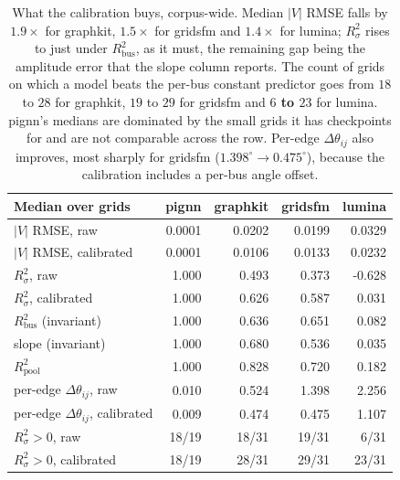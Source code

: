 \documentclass[10pt]{article}
\begin{document}
\begin{table}[H]
\centering\small
\begin{tabular}{lrrrr}
\toprule
Median over grids & pignn & graphkit & gridsfm & lumina\\
\midrule
$|V|$ RMSE, raw & 0.0001 & 0.0202 & 0.0199 & 0.0329 \\
$|V|$ RMSE, calibrated & 0.0001 & 0.0106 & 0.0133 & 0.0232 \\
$R^2_{\sigma}$, raw & 1.000 & 0.493 & 0.373 & -0.628 \\
$R^2_{\sigma}$, calibrated & 1.000 & 0.626 & 0.587 & 0.031 \\
$R^2_{\mathrm{bus}}$ (invariant) & 1.000 & 0.636 & 0.651 & 0.082 \\
slope (invariant) & 1.000 & 0.680 & 0.536 & 0.035 \\
$R^2_{\mathrm{pool}}$ & 1.000 & 0.828 & 0.720 & 0.182 \\
per-edge $\Delta\theta_{ij}$, raw & 0.010 & 0.524 & 1.398 & 2.256 \\
per-edge $\Delta\theta_{ij}$, calibrated & 0.009 & 0.474 & 0.475 & 1.107 \\
\midrule
$R^2_{\sigma}>0$, raw & 18/19 & 18/31 & 19/31 & 6/31 \\
$R^2_{\sigma}>0$, calibrated & 18/19 & 28/31 & 29/31 & 23/31 \\
\bottomrule
\end{tabular}
\caption{What the calibration buys, corpus-wide.  Median $|V|$ RMSE falls by
$1.9\times$ for graphkit, $1.5\times$ for gridsfm and $1.4\times$ for lumina;
$R^2_{\sigma}$ rises to just under $R^2_{\mathrm{bus}}$, as it must, the
remaining gap being the amplitude error that the slope column reports.  The
count of grids on which a model beats the per-bus constant predictor goes from
$18$ to $28$ for graphkit, $19$ to $29$ for gridsfm and \textbf{$6$ to $23$}
for lumina.  pignn's medians are dominated by the small grids it has
checkpoints for and are not comparable across the row.  Per-edge
$\Delta\theta_{ij}$ also improves, most sharply for gridsfm
($1.398^\circ\to0.475^\circ$), because the calibration includes a per-bus angle
offset.}
\end{table}
\end{document}
